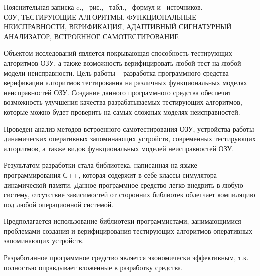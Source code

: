 \thispagestyle{empty}

\begin{center}
Пояснительная записка \pageref*{LastPage}c., \totfig{}~рис., \tottab{}~табл., \toteq{}~формул и \totref{}~источников.\\
\MakeUppercase{ОЗУ, тестирующие алгоритмы, функциональные неисправности, верификация, адаптивный сигнатурный анализатор, встроенное самотестирование}
\end{center}

Объектом исследований является покрывающая способность тестирующих алгоритмов ОЗУ, а также возможность верифицировать любой тест на любой модели неисправности.
Цель работы -- разработка программного средства верификации алгоритмов тестирования на различных функциональных моделях неисправностей ОЗУ.
Создание данного программного средства обеспечит возможность улучшения качества разрабатываемых тестирующих алгоритмов, которые можно будет проверить на самых сложных моделях неисправностей.

Проведен анализ методов встроенного самотестирования ОЗУ, устройства работы динамических оперативных запоминающих устройств, современных тестирующих алгоритмов, а также видов функциональных моделей неисправностей ОЗУ.

Результатом разработки стала библиотека, написанная на языке программирования С++, которая содержит в себе классы симулятора динамической памяти. Данное программное средство легко внедрить в любую систему, отсутствие зависимостей от сторонних библиотек облегчает компиляцию под любой операционной системой. 

Предполагается использование библиотеки программистами, занимающимися проблемами создания и верифицирования тестирующих алгоритмов оперативных запоминающих устройств.

Разработанное программное средство является экономически эффективным, т.к. полностью оправдывает вложенные в разработку средства. 

\clearpage

